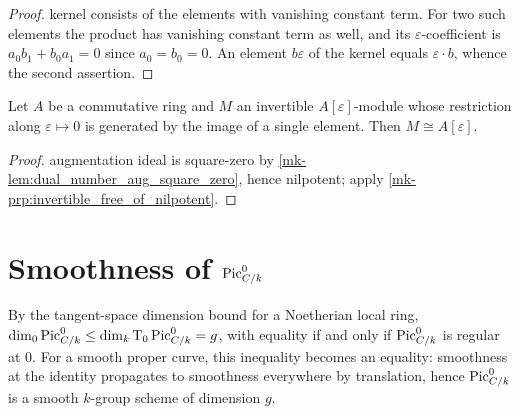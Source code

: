 \begin{proof}
  \leanokThe kernel consists of the elements with vanishing constant term. For two
  such elements the product has vanishing constant term as well, and its
  \(\varepsilon\)-coefficient is
  \(a_{0}b_{1} + b_{0}a_{1} = 0\) since \(a_{0} = b_{0} = 0\). An element
  \(b\varepsilon\) of the kernel equals \(\varepsilon \cdot b\), whence the
  second assertion.
\end{proof}

\begin{corollary}\label{mk-cor:dual_number_chart_triviality}
  \leanok

  Let \(A\) be a commutative ring and \(M\) an invertible
  \(A[\varepsilon]\)-module whose restriction along \(\varepsilon \mapsto 0\)
  is generated by the image of a single element. Then \(M \cong
  A[\varepsilon]\).
\end{corollary}

\begin{proof}
  \leanokThe augmentation ideal is square-zero by
  \ref{mk-lem:dual_number_aug_square_zero}, hence nilpotent; apply
  \ref{mk-prp:invertible_free_of_nilpotent}.
\end{proof}

\section{Smoothness of \(\operatorname{Pic}^0_{C/k}\)}
\label{mk-sec:pic0_smooth}

By the tangent-space dimension bound for a Noetherian local ring,
\(\dim_0 \operatorname{Pic}^0_{C/k} \le \dim_k \textup T_0 \operatorname{Pic}^0_{C/k} = g\), with
equality if and only if \(\operatorname{Pic}^0_{C/k}\) is regular at \(0\). For a
smooth proper curve, this inequality becomes an equality: smoothness
at the identity propagates to smoothness everywhere by
translation, hence \(\operatorname{Pic}^0_{C/k}\) is a smooth \(k\)-group scheme of
dimension \(g\).

